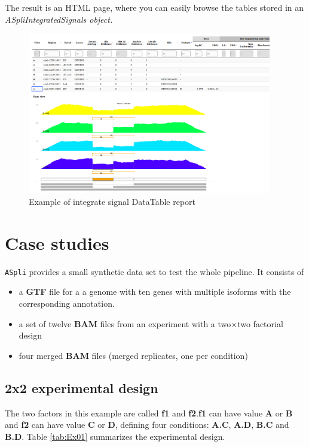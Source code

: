 \documentclass{article}
\begin{document}
The result is an HTML page, where you can easily browse the tables stored in an \em{ASpliIntegratedSignals}
object.


\begin{figure}[ht!]
  \centering
  \includegraphics[width=0.95\textwidth]{images/aspliInteraction.png}
  \caption{Example of integrate signal DataTable report}
  \label{fig:integratedSignals}
\end{figure}



\section{Case studies}

\texttt{ASpli} provides a small synthetic data set to test the whole pipeline. It consists of
\begin{itemize}
 \item a \textbf{GTF} file for a a genome with ten genes with multiple isoforms with the corresponding annotation. 
 \item a set of twelve \textbf{BAM} files from an experiment with a two$\times$two factorial design
 \item four merged \textbf{BAM} files (merged replicates, one per condition)
  \end{itemize}
 
\subsection{2x2 experimental design} 
The two factors in this example are called \textbf{f1} and \textbf{f2}.\textbf{f1} can have value \textbf{A} or \textbf{B} and \textbf{f2} can have value \textbf{C} or
\textbf{D}, defining four conditions: \textbf{A.C}, \textbf{A.D}, \textbf{B.C}
and \textbf{B.D}. Table \ref{tab:Ex01} summarizes the  experimental design.
\end{document}
